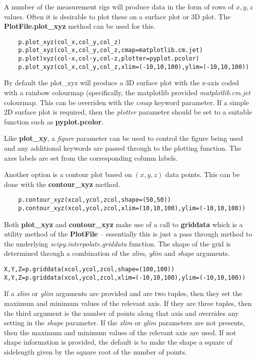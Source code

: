 \documentclass[a4paper,11pt]{scrartcl}
\begin{document}
 A number of the measurement rigs will produce data in the form of rows of $x,y,z$ values. Often it is desirable to plot these on a surface plot or 3D plot. The \textbf{PlotFile.plot\_xyz} method can be used for this.

 \begin{lstlisting}
    p.plot_xyz(col_x,col_y,col_z)
    p.plot_xyz(col_x,col_y,col_z,cmap=matplotlib.cm.jet)
    p.plot)xyz(col-x,col-y,col-z,plotter=pyplot.pcolor)
    p.plot_xyz(col_x,col_y,col_z,xlim=(-10,10,100),ylim=(-10,10,100))
 \end{lstlisting}

 By default the plot\_xyz will produce a 3D surface plot with the z-axis coded with a rainbow colourmap (specifically, the matplotlib provided \textit{matplotlib.cm.jet} colourmap. This can be overriden with the \textit{cmap} keyword parameter. If a simple 2D surface plot is required, then the \textit{plotter} parameter should be set to a suitable function such as \textbf{pyplot.pcolor}.

 Like \textbf{plot\_xy}, a \textit{figure} parameter can be used to control the figure being used and any additional keywords are passed through to the plotting function. The axes labels are set from the corresponding column labels.

 Another option is a contour plot based on $(x,y,z)$ data points. This can be done with the \textbf{contour\_xyz} method.

 \begin{lstlisting}
 	p.contour_xyz(xcol,ycol,zcol,shape=(50,50))
 	p.contour_xyz(xcol,ycol,zcol,xlim=(10,10,100),ylim=(-10,10,100))
\end{lstlisting}

Both \textbf{plot\_xyz} and \textbf{contour\_xyz} make use of a call to \textbf{griddata} which is a utility method of the \textbf{PlotFile} -- essentially this is just a pass through method to the underlying \textit{scipy.interpolate.griddata} function. The shape of the grid is determined through a combination of the \textit{xlim}, \textit{ylim} and \textit{shape} arguments.

\begin{lstlisting}
X,Y,Z=p.griddata(xcol,ycol,zcol,shape=(100,100))
X,Y,Z=p.griddata(xcol,ycol,zcol,xlim=(-10,10,100),ylim=(-10,10,100))
\end{lstlisting}

If a \textit{xlim} or \textit{ylim} arguments are provided and are two tuples, then they set the maximum and minimum values of the relevant axis. If they are three tuples, then the third argument is the number of points along that axis and overrides any setting in the \textit{shape} parameter. If the \textit{xlim} or \textit{ylim} parameters are not presents, then the maximum and minimum values of the relevant axis are used. If not shape information is provided, the default is to make the shape a square of sidelength given by the square root of the number of points.
\end{document}
